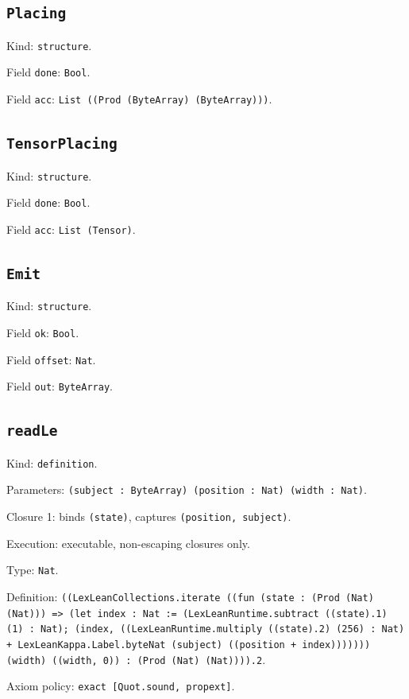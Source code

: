 \documentclass[11pt]{article}
\begin{document}
\subsection*{\texttt{Placing}}
\noindent Kind: \texttt{structure}.\par
\noindent Field \texttt{done}: \texttt{Bool}.\par
\noindent Field \texttt{acc}: \texttt{List ((Prod (ByteArray) (ByteArray)))}.\par
\subsection*{\texttt{TensorPlacing}}
\noindent Kind: \texttt{structure}.\par
\noindent Field \texttt{done}: \texttt{Bool}.\par
\noindent Field \texttt{acc}: \texttt{List (Tensor)}.\par
\subsection*{\texttt{Emit}}
\noindent Kind: \texttt{structure}.\par
\noindent Field \texttt{ok}: \texttt{Bool}.\par
\noindent Field \texttt{offset}: \texttt{Nat}.\par
\noindent Field \texttt{out}: \texttt{ByteArray}.\par
\subsection*{\texttt{readLe}}
\noindent Kind: \texttt{definition}.\par
\noindent Parameters: \texttt{(subject : ByteArray) (position : Nat) (width : Nat)}.\par
\noindent Closure 1: binds \texttt{(state)}, captures \texttt{(position, subject)}.\par
\noindent Execution: executable, non-escaping closures only.\par
\noindent Type: \texttt{Nat}.\par
\noindent Definition: \texttt{((LexLeanCollections.iterate ((fun (state : (Prod (Nat) (Nat))) => (let index : Nat := (LexLeanRuntime.subtract ((state).1) (1) : Nat); (index, ((LexLeanRuntime.multiply ((state).2) (256) : Nat) + LexLeanKappa.Label.byteNat (subject) ((position + index))))))) (width) ((width, 0)) : (Prod (Nat) (Nat)))).2}.\par
\noindent Axiom policy: \texttt{exact [Quot.sound, propext]}.\par
\end{document}
